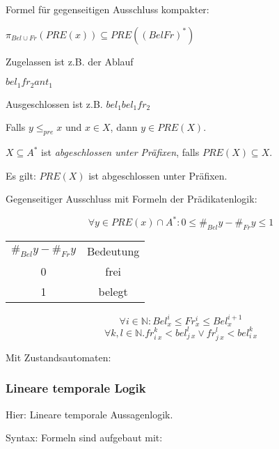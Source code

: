 Formel für gegenseitigen Ausschluss kompakter:

$ \pi_{Bel \cup Fr} (PRE(x)) \subseteq PRE((Bel Fr)^*) $

Zugelassen ist z.B. der Ablauf

$ bel_1 fr_2 ant_1 $

Ausgeschlossen ist z.B. $ bel_1 bel_1 fr_2 $

Falls $ y \leq_{pre} x $ und $ x \in X $, dann $ y \in PRE(X) $.

$ X \subseteq A^* $ ist \emph{abgeschlossen unter Präfixen}, falls $ PRE(X) \subseteq X $.

Es gilt: $ PRE(X) $ ist abgeschlossen unter Präfixen.

Gegenseitiger Ausschluss mit Formeln der Prädikatenlogik:

\begin{equation*}
\forall y \in PRE(x) \cap A^* : 0 \leq \#_{Bel}y - \#_{Fr}y \leq 1
\end{equation*}

\begin{center}
\begin{tabular}{c | c}
$ \#_{Bel}y - \#_{Fr}y $ & Bedeutung \\
0 & frei \\
1 & belegt
\end{tabular}
\end{center}

\begin{equation*}
\forall i \in \mathbb{N} : Bel_x^i \leq Fr_x^i \leq Bel_x^{i + 1}
\end{equation*}
\begin{equation*} %
\forall k, l \in \mathbb{N}. fr_{i\ x}^k < bel_{j\ x}^l \vee fr_{j\ x}^l < bel_{i\ x}^k
\end{equation*}

Mit Zustandsautomaten:


\subsubsection*{Lineare temporale Logik}
Hier: Lineare temporale Aussagenlogik.

Syntax: Formeln sind aufgebaut mit:

